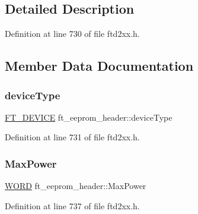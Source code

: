 \subsection{Detailed Description}


Definition at line 730 of file ftd2xx.\+h.



\subsection{Member Data Documentation}
\mbox{\label{structft__eeprom__header_a3b27d86c243b51e47e6c279f0ef56251}} 
\subsubsection{\texorpdfstring{device\+Type}{deviceType}}
{\footnotesize\ttfamily \hyperlink{LALUsbMLx64_2include_2ftd2xx_8h_a93f97052222c089b780302ff9c175cb6}{F\+T\+\_\+\+D\+E\+V\+I\+CE} ft\+\_\+eeprom\+\_\+header\+::device\+Type}



Definition at line 731 of file ftd2xx.\+h.

\mbox{\label{structft__eeprom__header_a28ce835ee57a5f21794798f64022d89b}} 
\subsubsection{\texorpdfstring{Max\+Power}{MaxPower}}
{\footnotesize\ttfamily \hyperlink{CatCaloProto40MHz_2inc_2WinTypes_8h_a197942eefa7db30960ae396d68339b97}{W\+O\+RD} ft\+\_\+eeprom\+\_\+header\+::\+Max\+Power}



Definition at line 737 of file ftd2xx.\+h.

\mbox{\label{structft__eeprom__header_a342079ae92d0b71e0e71bde526ded445}} 
